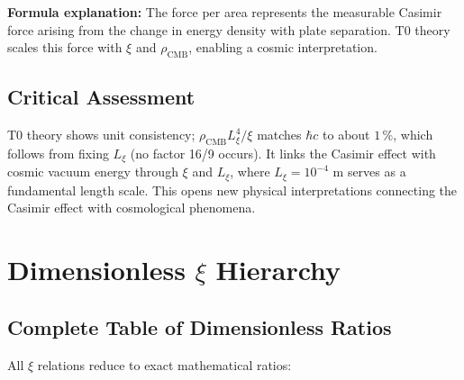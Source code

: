 	\textbf{Formula explanation:} The force per area represents the measurable Casimir force arising from the change in energy density with plate separation. T0 theory scales this force with $\xi$ and $\rho_{\text{CMB}}$, enabling a cosmic interpretation.
	
	\subsection{Critical Assessment}
	T0 theory shows unit consistency; $\rho_{\text{CMB}} L_\xi^4/\xi$ matches $\hbar c$ to about $1\,\%$, which follows from fixing $L_\xi$ (no factor 16/9 occurs). It links the Casimir effect with cosmic vacuum energy through $\xi$ and $L_\xi$, where $L_\xi = 10^{-4}$ m serves as a fundamental length scale. This opens new physical interpretations connecting the Casimir effect with cosmological phenomena.
	
	\section{Dimensionless $\xi$ Hierarchy}
	
	\subsection{Complete Table of Dimensionless Ratios}
	
	All $\xi$ relations reduce to exact mathematical ratios:
	
	\begin{table}[htbp]
		\centering
		\caption{Dimensionless $\xi$ ratios in T0 theory}
	\end{table}
	
